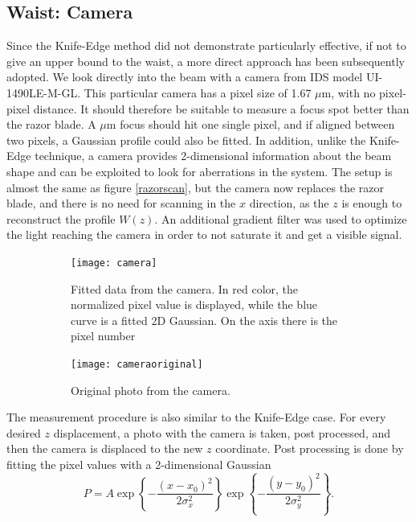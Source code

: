 \subsection{Waist: Camera}
\label{waistcamera}
Since the Knife-Edge method did not demonstrate particularly effective, if not to give an upper bound to the waist, a more direct approach has been subsequently adopted. We look directly into the beam with a camera from IDS model UI-1490LE-M-GL. This particular camera has a pixel size of 1.67 $\mu$m, with no pixel-pixel distance. It should therefore be suitable to measure a focus spot better than the razor blade. A $\mu$m focus should hit one single pixel, and if aligned between two pixels, a Gaussian profile could also be fitted.
In addition, unlike the Knife-Edge technique, a camera provides 2-dimensional information about the beam shape and can be exploited to look for aberrations in the system. The setup is almost the same as figure \ref{razorscan}, but the camera now replaces the razor blade, and there is no need for scanning in the $x$ direction, as the $z$ is enough to reconstruct the profile $W(z)$. An additional gradient filter was used to optimize the light reaching the camera in order to not saturate it and get a visible signal.
\begin{figure}
     \centering
     \begin{subfigure}[b]{0.67\textwidth}
         \centering
         \texttt{[image: camera]}
          \caption{Fitted data from the camera. In red color, the normalized pixel value is displayed, while the blue curve is a fitted 2D Gaussian. On the axis there is the pixel number}
     \end{subfigure}
     \hfill
     \begin{subfigure}[b]{0.3\textwidth}
         \centering
         \texttt{[image: cameraoriginal]}
        \vspace{5em}
         \caption{Original photo from the camera.}

     \end{subfigure}
        \caption{}
       \label{fig:camera}
\end{figure}
The measurement procedure is also similar to the Knife-Edge case. For every desired $z$ displacement, a photo with the camera is taken, post processed, and then the camera is displaced to the new $z$ coordinate. Post processing is done by fitting the pixel values with a 2-dimensional Gaussian
\begin{equation}
P = A \exp\left\{-\frac{(x-x_0)^2}{2\sigma_x^2}\right\} \exp\left\{-\frac{(y-y_0)^2}{2\sigma_y^2} \right\}.
\end{equation}
